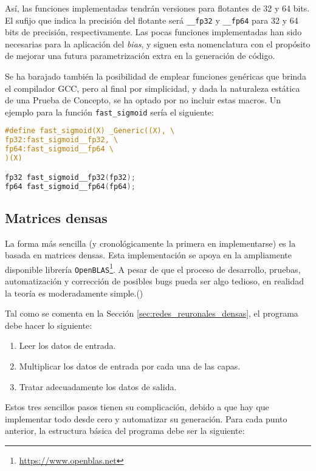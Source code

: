 Así, las funciones implementadas tendrán versiones para flotantes de 32 y 64 bits. El sufijo que indica la precisión del flotante será \texttt{\_\_fp32} y \texttt{\_\_fp64} para 32 y 64 bits de precisión, respectivamente. Las pocas funciones implementadas han sido necesarias para la aplicación del \textit{bias}, y siguen esta nomenclatura con el propósito de mejorar una futura parametrización extra en la generación de código.

Se ha barajado también la posibilidad de emplear funciones genéricas que brinda el compilador GCC, pero al final por simplicidad, y dada la naturaleza estática de una Prueba de Concepto, se ha optado por no incluir estas macros. Un ejemplo para la función \texttt{fast\_sigmoid} sería el siguiente:\medskip
\begin{lstlisting}[language=C]
#define fast_sigmoid(X) _Generic((X), \
fp32:fast_sigmoid__fp32, \
fp64:fast_sigmoid__fp64 \
)(X)

fp32 fast_sigmoid__fp32(fp32);
fp64 fast_sigmoid__fp64(fp64);
\end{lstlisting}


\subsection{Matrices densas}
\label{ssec:gdin_matrices_densas}
La forma más sencilla (y cronológicamente la primera en implementarse) es la basada en matrices densas. Esta implementación se apoya en la ampliamente disponible librería \texttt{OpenBLAS}\footnote{\url{https://www.openblas.net}}. A pesar de que el proceso de desarrollo, pruebas, automatización y corrección de posibles bugs pueda ser algo tedioso, en realidad la teoría es moderadamente simple.()

Tal como se comenta en la Sección \ref{sec:redes_reuronales_densas}, el programa debe hacer lo siguiente:

\begin{enumerate}
    \item Leer los datos de entrada.
    \item Multiplicar los datos de entrada por cada una de las capas.
    \item Tratar adecuadamente los datos de salida.
\end{enumerate}

Estos tres sencillos pasos tienen su complicación, debido a que hay que implementar todo desde cero y automatizar su generación. Para cada punto anterior, la estructura básica del programa debe ser la siguiente:

